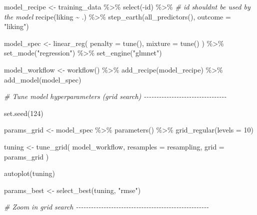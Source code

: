 \documentclass[
]{book}
\newenvironment{Shaded}{\begin{snugshade}}{\end{snugshade}}
\newcommand{\AttributeTok}[1]{\textcolor[rgb]{0.77,0.63,0.00}{#1}}
\newcommand{\CommentTok}[1]{\textcolor[rgb]{0.56,0.35,0.01}{\textit{#1}}}
\newcommand{\DecValTok}[1]{\textcolor[rgb]{0.00,0.00,0.81}{#1}}
\newcommand{\FunctionTok}[1]{\textcolor[rgb]{0.00,0.00,0.00}{#1}}
\newcommand{\NormalTok}[1]{#1}
\newcommand{\OtherTok}[1]{\textcolor[rgb]{0.56,0.35,0.01}{#1}}
\newcommand{\SpecialCharTok}[1]{\textcolor[rgb]{0.00,0.00,0.00}{#1}}
\newcommand{\StringTok}[1]{\textcolor[rgb]{0.31,0.60,0.02}{#1}}
\begin{document}
\begin{Shaded}
\begin{Highlighting}[]
\NormalTok{model\_recipe }\OtherTok{\textless{}{-}}\NormalTok{ training\_data }\SpecialCharTok{\%\textgreater{}\%}
  \FunctionTok{select}\NormalTok{(}\SpecialCharTok{{-}}\NormalTok{id) }\SpecialCharTok{\%\textgreater{}\%} \CommentTok{\# id shouldn\textquotesingle{}t be used by the model}
  \FunctionTok{recipe}\NormalTok{(liking }\SpecialCharTok{\textasciitilde{}}\NormalTok{ .) }\SpecialCharTok{\%\textgreater{}\%}
  \FunctionTok{step\_earth}\NormalTok{(}\FunctionTok{all\_predictors}\NormalTok{(), }\AttributeTok{outcome =} \StringTok{"liking"}\NormalTok{)}

\NormalTok{model\_spec }\OtherTok{\textless{}{-}} \FunctionTok{linear\_reg}\NormalTok{(}
  \AttributeTok{penalty =} \FunctionTok{tune}\NormalTok{(),}
  \AttributeTok{mixture =} \FunctionTok{tune}\NormalTok{()}
\NormalTok{) }\SpecialCharTok{\%\textgreater{}\%}
  \FunctionTok{set\_mode}\NormalTok{(}\StringTok{"regression"}\NormalTok{) }\SpecialCharTok{\%\textgreater{}\%}
  \FunctionTok{set\_engine}\NormalTok{(}\StringTok{"glmnet"}\NormalTok{)}

\NormalTok{model\_workflow }\OtherTok{\textless{}{-}} \FunctionTok{workflow}\NormalTok{() }\SpecialCharTok{\%\textgreater{}\%}
  \FunctionTok{add\_recipe}\NormalTok{(model\_recipe) }\SpecialCharTok{\%\textgreater{}\%}
  \FunctionTok{add\_model}\NormalTok{(model\_spec)}


\CommentTok{\# Tune model hyperparameters (grid search) {-}{-}{-}{-}{-}{-}{-}{-}{-}{-}{-}{-}{-}{-}{-}{-}{-}{-}{-}{-}{-}{-}{-}{-}{-}{-}{-}{-}{-}{-}{-}{-}{-}}

\FunctionTok{set.seed}\NormalTok{(}\DecValTok{124}\NormalTok{)}

\NormalTok{params\_grid }\OtherTok{\textless{}{-}}\NormalTok{ model\_spec }\SpecialCharTok{\%\textgreater{}\%}
  \FunctionTok{parameters}\NormalTok{() }\SpecialCharTok{\%\textgreater{}\%}
  \FunctionTok{grid\_regular}\NormalTok{(}\AttributeTok{levels =} \DecValTok{10}\NormalTok{)}

\NormalTok{tuning }\OtherTok{\textless{}{-}} \FunctionTok{tune\_grid}\NormalTok{(}
\NormalTok{  model\_workflow,}
  \AttributeTok{resamples =}\NormalTok{ resampling,}
  \AttributeTok{grid =}\NormalTok{ params\_grid}
\NormalTok{)}

\FunctionTok{autoplot}\NormalTok{(tuning)}

\NormalTok{params\_best }\OtherTok{\textless{}{-}} \FunctionTok{select\_best}\NormalTok{(tuning, }\StringTok{"rmse"}\NormalTok{)}


\CommentTok{\# Zoom in grid search {-}{-}{-}{-}{-}{-}{-}{-}{-}{-}{-}{-}{-}{-}{-}{-}{-}{-}{-}{-}{-}{-}{-}{-}{-}{-}{-}{-}{-}{-}{-}{-}{-}{-}{-}{-}{-}{-}{-}{-}{-}{-}{-}{-}{-}{-}{-}{-}{-}{-}{-}{-}{-}}


\end{Highlighting}
\end{Shaded}
\end{document}
